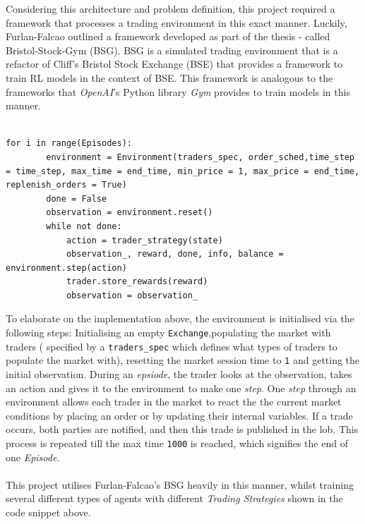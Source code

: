 \documentclass[ %
                    author={Ashwinder Khurana},
                supervisor={Prof Dave Cliff},
                    degree={MEng},
                     title={The Deeply Reinforced Trader},
                  subtitle={},
                      type={enterprise},
                      year={2020} ]{dissertation}
\begin{document}
{\noindent
Considering this architecture and problem definition, this project required a framework that processes a trading environment in this exact manner. Luckily, Furlan-Falcao outlined a framework developed as part of the thesis - called Bristol-Stock-Gym (BSG). BSG is a simulated trading environment that is a refactor of Cliff's Bristol Stock Exchange (BSE) that provides a framework to train RL models in the context of BSE. This framework is analogous to the frameworks that \textit{OpenAI}'s Python library \textit{Gym} provides to train models in this manner. 
\\
\\
\begin{lstlisting}[label=main-loop, caption = Main loop to step through trading environment]
for i in range(Episodes):
        environment = Environment(traders_spec, order_sched,time_step = time_step, max_time = end_time, min_price = 1, max_price = end_time, replenish_orders = True)
        done = False
        observation = environment.reset()
        while not done:
            action = trader_strategy(state)
            observation_, reward, done, info, balance = environment.step(action)
            trader.store_rewards(reward)
            observation = observation_
\end{lstlisting}
\vspace{0.5cm}
\noindent
To elaborate on the implementation above, the environment is initialised via the following steps:  Initialising an empty \texttt{Exchange},populating the market with traders ( specified by a \texttt{traders\_spec} which defines what types of traders to populate the market with), resetting the market session time to \texttt{1} and getting the initial observation. During an \textit{epsiode}, the trader looks at the observation, takes an action and gives it to the environment to make one \textit{step}. One \textit{step} through an environment allows each trader in the market to react the the current market conditions by placing an order or by updating their internal variables. If a trade occurs, both parties are notified, and then this trade is published in the lob. This process is repeated till the max time \texttt{1000} is reached, which signifies the end of one \textit{Episode}. 
\\
\\
\noindent
This project utilises Furlan-Falcao's BSG heavily in this manner, whilst training several different types of agents with different \textit{Trading Strategies} shown in the code snippet above.

}
\end{document}
